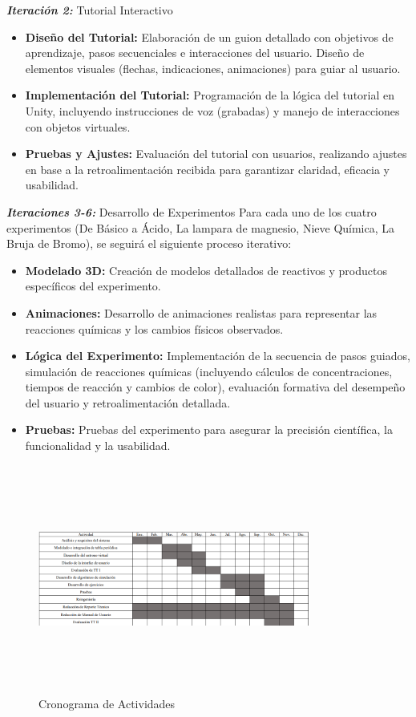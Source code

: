 \textit{\textbf{Iteración 2:}} Tutorial Interactivo
\begin{itemize}
    \item \textbf{Diseño del Tutorial:} Elaboración de un guion detallado con objetivos de aprendizaje, pasos secuenciales e interacciones del usuario. Diseño de elementos visuales (flechas, indicaciones, animaciones) para guiar al usuario.
    \item \textbf{Implementación del Tutorial:} Programación de la lógica del tutorial en Unity, incluyendo instrucciones de voz (grabadas) y manejo de interacciones con objetos virtuales.
    \item \textbf{Pruebas y Ajustes:} Evaluación del tutorial con usuarios, realizando ajustes en base a la retroalimentación recibida para garantizar claridad, eficacia y usabilidad.
\end{itemize}
\newpage
\textit{\textbf{Iteraciones 3-6:}} Desarrollo de Experimentos
Para cada uno de los cuatro experimentos (De Básico a Ácido, La lampara de magnesio, Nieve Química, La Bruja de Bromo), se seguirá el siguiente proceso iterativo:
\begin{itemize}
    \item \textbf{Modelado 3D:} Creación de modelos detallados de reactivos y productos específicos del experimento.
    \item \textbf{Animaciones:} Desarrollo de animaciones realistas para representar las reacciones químicas y los cambios físicos observados.
    \item \textbf{Lógica del Experimento:} Implementación de la secuencia de pasos guiados, simulación de reacciones químicas (incluyendo cálculos de concentraciones, tiempos de reacción y cambios de color), evaluación formativa del desempeño del usuario y retroalimentación detallada.
    \item \textbf{Pruebas:} Pruebas del experimento para asegurar la precisión científica, la funcionalidad y la usabilidad.
\end{itemize}

\begin{figure}[thbp]
    \centering
    \includegraphics[width=0.8\textwidth, height = 7.5cm]{img/chapter03/Cronograma.png}
    \caption{Cronograma de Actividades}
    \label{fig:Cronograma}
\end{figure}

